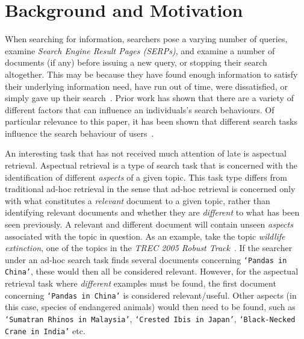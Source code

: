 \section{Background and Motivation}\label{sec:background}
When searching for information, searchers pose a varying number of queries, examine \emph{Search Engine Result Pages (SERPs)}, and examine a number of documents (if any) before issuing a new query, or stopping their search altogether. This may be because they have found enough information to satisfy their underlying information need, have run out of time, were dissatisfied, or simply gave up their search~\cite{diriye2012abandonment,dostert2009stopping_behaviours,hassan2013beyond_clicks,kiseleva2015serp_fails,prabha2007enough,zach2005stopping_behaviours}. Prior work has shown that there are a variety of different factors that can influence an individuals's search behaviours. Of particular relevance to this paper, it has been shown that different search tasks influence the search behaviour of users~\cite{kelly2015search_tasks}.

An interesting task that has not received much attention of late is aspectual retrieval. Aspectual retrieval is a type of search task that is concerned with the identification of different \emph{aspects} of a given topic. This task type differs from traditional ad-hoc retrieval in the sense that ad-hoc retrieval is concerned only with what constitutes a \emph{relevant} document to a given topic, rather than identifying relevant documents and whether they are \emph{different} to what has been seen previously. A relevant and different document will contain unseen \emph{aspects} associated with the topic in question. As an example, take the topic \emph{wildlife extinction}, one of the topics in the \emph{TREC 2005 Robust Track}~\cite{voorhees2006trec_robust}. If the searcher under an ad-hoc search task finds several documents concerning \texttt{`Pandas in China'}, these would then all be considered relevant. However, for the aspectual retrieval task where \emph{different} examples must be found, the first document concerning \texttt{`Pandas in China'} is considered relevant/useful. Other aspects (in this case, species of endangered animals) would then need to be found, such as \texttt{`Sumatran Rhinos in Malaysia'}, \texttt{`Crested Ibis in Japan'}, \texttt{`Black-Necked Crane in India'} etc.

